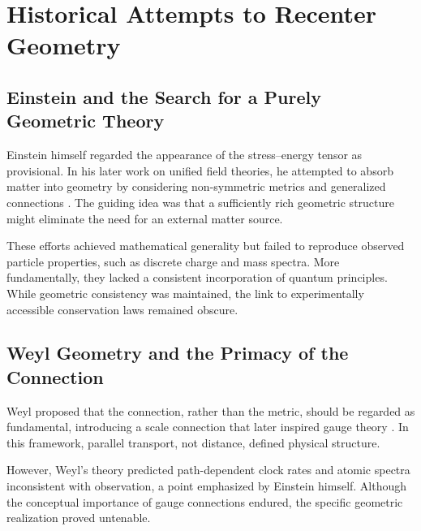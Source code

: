 \documentclass[%
 reprint,
 amsmath,amssymb,
 aps,
 prb,
]{revtex4-2}
\numberwithin{equation}{section}
\begin{document}
\section{Historical Attempts to Recenter Geometry}
\label{sec:historical}

\subsection{Einstein and the Search for a Purely Geometric Theory}
\label{sec:einstein_geo}

Einstein himself regarded the appearance of the stress--energy tensor as provisional. In his later work on unified field theories, he attempted to absorb matter into geometry by considering non-symmetric metrics and generalized connections \cite{EinsteinUnified}. The guiding idea was that a sufficiently rich geometric structure might eliminate the need for an external matter source.

These efforts achieved mathematical generality but failed to reproduce observed particle properties, such as discrete charge and mass spectra. More fundamentally, they lacked a consistent incorporation of quantum principles. While geometric consistency was maintained, the link to experimentally accessible conservation laws remained obscure.

\subsection{Weyl Geometry and the Primacy of the Connection}
\label{sec:weyl}

Weyl proposed that the connection, rather than the metric, should be regarded as fundamental, introducing a scale connection that later inspired gauge theory \cite{Weyl1918}. In this framework, parallel transport, not distance, defined physical structure.

However, Weyl's theory predicted path-dependent clock rates and atomic spectra inconsistent with observation, a point emphasized by Einstein himself. Although the conceptual importance of gauge connections endured, the specific geometric realization proved untenable.
\end{document}
